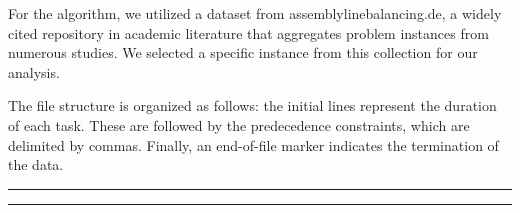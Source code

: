 \documentclass[12pt,a4paper]{article}
\begin{document}
For the algorithm, we utilized a dataset from assemblylinebalancing.de, a widely cited repository in academic literature that aggregates problem instances from numerous studies. We selected a specific instance from this collection for our analysis.

The file structure is organized as follows: the initial lines represent the duration of each task. These are followed by the predecedence constraints, which are delimited by commas. Finally, an end-of-file marker indicates the termination of the data.


\newpage
\par\medskip
{}
\noindent\rule{\linewidth}{0.4pt}\par
{}
\label{alg:ga_ualbp2}
\noindent\rule{\linewidth}{0.4pt}\par
\footnotesize
\end{document}
